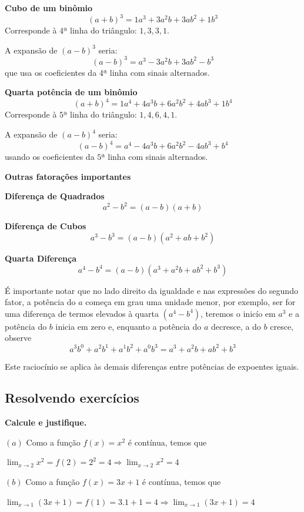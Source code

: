 \documentclass[12pt,openright,twoside,a4paper]{article}
\theoremstyle{definition}
\begin{document}
\begin{snugshade}
		\textbf{Cubo de um binômio}
		\[ (a + b)^3 = \boxed{1}a^3 + \boxed{3}a^2b + \boxed{3}ab^2 + \boxed{1}b^3 \]
		Corresponde à $4$ª linha do triângulo: $1, 3, 3, 1$.
		
		A expansão de $(a - b)^3$ seria:
		\[ (a - b)^3 = a^3 - 3a^2b + 3ab^2 - b^3 \]
		que usa os coeficientes da 4ª linha com sinais alternados.
		
		\textbf{Quarta potência de um binômio}
		\[ (a + b)^4 = \boxed{1}a^4 + \boxed{4}a^3b + \boxed{6}a^2b^2 + \boxed{4}ab^3 + \boxed{1}b^4 \]
		Corresponde à $5$ª linha do triângulo: $1, 4, 6, 4, 1$.
		
		A expansão de $(a - b)^4$ seria:
		\[ (a - b)^4 = a^4 - 4a^3b + 6a^2b^2 - 4ab^3 + b^4 \]
		usando os coeficientes da $5$ª linha com sinais alternados.
		
		\textbf{\large{Outras fatorações importantes}}
		
		\textbf{Diferença de Quadrados}
		\[ a^2 - b^2 = (a - b)(a + b) \]
		
		\textbf{Diferença de Cubos}
		\[ a^3 - b^3 = (a - b)(a^2 + ab + b^2) \]
		
		\textbf{Quarta Diferença}
		\[ a^4 - b^4 = (a - b)(a^3 + a^2b + ab^2 + b^3) \]
		
		É importante notar que no lado direito da igualdade e nas expressões do segundo fator, a potência do $a$ começa em grau uma unidade menor, por exemplo, ser for uma diferença de termos elevados à quarta $(a^{4} - b^{4})$, teremos o inicío em $a^{3}$ e a potência do $b$ inicia em zero e, enquanto a potência do $a$ decresce, a do $b$ cresce, observe
		\[a^3b^{0} + a^2b^{1} + a^{1}b^2 + a^{0}b^3 = a^3 + a^2b + ab^2 + b^3\]
		
		Este raciocínio se aplica às demais diferenças entre potências de expoentes iguais.
	\end{snugshade}
	
	
	
	\subsection{Resolvendo exercícios}
	\textbf{Calcule e justifique.}

		
		$(a)$ Como a função $f(x) = x^{2}$ é contínua, temos que \begin{center}$\displaystyle{\lim_{x \to 2} x^{2}} = f(2) = 2^{2} = 4 \Longrightarrow \displaystyle{\lim_{x \to 2} x^{2}} = 4$\end{center}
		
		$(b)$ Como a função $f(x) = 3x + 1$ é contínua, temos que \begin{center}$\displaystyle{\lim_{x \to 1} (3x + 1)} = f(1) = 3.1 + 1 = 4 \Longrightarrow \displaystyle{\lim_{x \to 1} (3x + 1)} = 4$\end{center}
		
\end{document}
